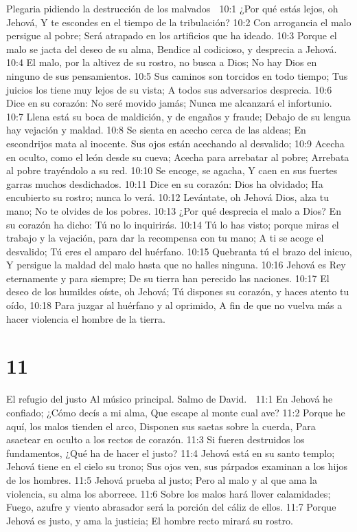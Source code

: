 Plegaria pidiendo la destrucción de los malvados 

10:1 ¿Por qué estás lejos, oh Jehová, 
Y te escondes en el tiempo de la tribulación? 
10:2 Con arrogancia el malo persigue al pobre; 
Será atrapado en los artificios que ha ideado. 
10:3 Porque el malo se jacta del deseo de su alma, 
Bendice al codicioso, y desprecia a Jehová. 
10:4 El malo, por la altivez de su rostro, no busca a Dios; 
No hay Dios en ninguno de sus pensamientos. 
10:5 Sus caminos son torcidos en todo tiempo; 
Tus juicios los tiene muy lejos de su vista; 
A todos sus adversarios desprecia. 
10:6 Dice en su corazón: No seré movido jamás; 
Nunca me alcanzará el infortunio. 
10:7 Llena está su boca de maldición, y de engaños y fraude; 
Debajo de su lengua hay vejación y maldad. 
10:8 Se sienta en acecho cerca de las aldeas; 
En escondrijos mata al inocente. 
Sus ojos están acechando al desvalido; 
10:9 Acecha en oculto, como el león desde su cueva; 
Acecha para arrebatar al pobre; 
Arrebata al pobre trayéndolo a su red. 
10:10 Se encoge, se agacha, 
Y caen en sus fuertes garras muchos desdichados. 
10:11 Dice en su corazón: Dios ha olvidado; 
Ha encubierto su rostro; nunca lo verá. 
10:12 Levántate, oh Jehová Dios, alza tu mano; 
No te olvides de los pobres. 
10:13 ¿Por qué desprecia el malo a Dios? 
En su corazón ha dicho: Tú no lo inquirirás. 
10:14 Tú lo has visto; porque miras el trabajo y la vejación, para dar la recompensa con tu mano; 
A ti se acoge el desvalido; 
Tú eres el amparo del huérfano. 
10:15 Quebranta tú el brazo del inicuo, 
Y persigue la maldad del malo hasta que no halles ninguna. 
10:16 Jehová es Rey eternamente y para siempre; 
De su tierra han perecido las naciones. 
10:17 El deseo de los humildes oíste, oh Jehová; 
Tú dispones su corazón, y haces atento tu oído, 
10:18 Para juzgar al huérfano y al oprimido, 
A fin de que no vuelva más a hacer violencia el hombre de la tierra. 

\chapter{11}

El refugio del justo 
Al músico principal. Salmo de David. 

11:1 En Jehová he confiado; 
¿Cómo decís a mi alma, 
Que escape al monte cual ave? 
11:2 Porque he aquí, los malos tienden el arco, 
Disponen sus saetas sobre la cuerda, 
Para asaetear en oculto a los rectos de corazón. 
11:3 Si fueren destruidos los fundamentos, 
¿Qué ha de hacer el justo? 
11:4 Jehová está en su santo templo; 
Jehová tiene en el cielo su trono; 
Sus ojos ven, sus párpados examinan a los hijos de los hombres. 
11:5 Jehová prueba al justo; 
Pero al malo y al que ama la violencia, su alma los aborrece. 
11:6 Sobre los malos hará llover calamidades; 
Fuego, azufre y viento abrasador será la porción del cáliz de ellos. 
11:7 Porque Jehová es justo, y ama la justicia; 
El hombre recto mirará su rostro. 

